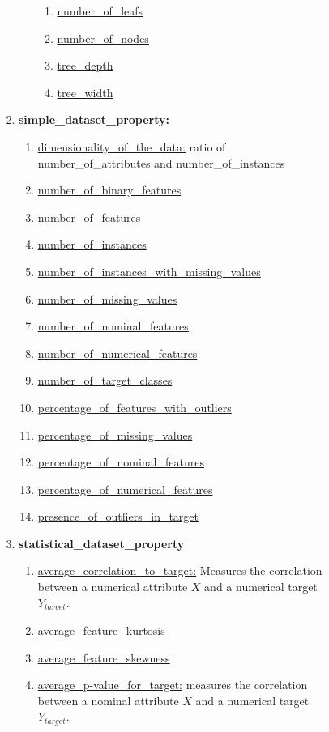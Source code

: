 \documentclass[a4paper,12pt, english]{article}
\begin{document}
\begin{enumerate}
\begin{enumerate}
\begin{enumerate}
\begin{enumerate}
\begin{enumerate}
\begin{enumerate}
\begin{enumerate}
					\item \underline{number\_of\_leafs}
					\item \underline{number\_of\_nodes}
					\item \underline{tree\_depth}
					\item \underline{tree\_width}
					\end{enumerate}				
				\end{enumerate}			
			\item \textbf{simple\_dataset\_property:}
				\begin{enumerate}
				\item \underline{dimensionality\_of\_the\_data:} ratio of number\_of\_attributes and number\_of\_instances
				\item \underline{number\_of\_binary\_features}
				\item \underline{number\_of\_features}
				\item \underline{number\_of\_instances}
				\item \underline{number\_of\_instances\_with\_missing\_values}
				\item \underline{number\_of\_missing\_values}
				\item \underline{number\_of\_nominal\_features}
				\item \underline{number\_of\_numerical\_features}
				\item \underline{number\_of\_target\_classes}
				\item \underline{percentage\_of\_features\_with\_outliers}
				\item \underline{percentage\_of\_missing\_values}
				\item \underline{percentage\_of\_nominal\_features}
				\item \underline{percentage\_of\_numerical\_features}
				\item \underline{presence\_of\_outliers\_in\_target}
				\end{enumerate}			
			\item \textbf{statistical\_dataset\_property}
				\begin{enumerate}
				\item \underline{average\_correlation\_to\_target:} Measures the correlation between a numerical attribute $X$ and a numerical target $Y_{target}$.
				\item \underline{average\_feature\_kurtosis}
				\item \underline{average\_feature\_skewness}
				\item \underline{average\_p-value\_for\_target:} measures the correlation between a nominal attribute $X$ and a numerical target $Y_{target}$.

\end{enumerate}
\end{enumerate}
\end{enumerate}
\end{enumerate}
\end{enumerate}
\end{enumerate}
\end{document}
